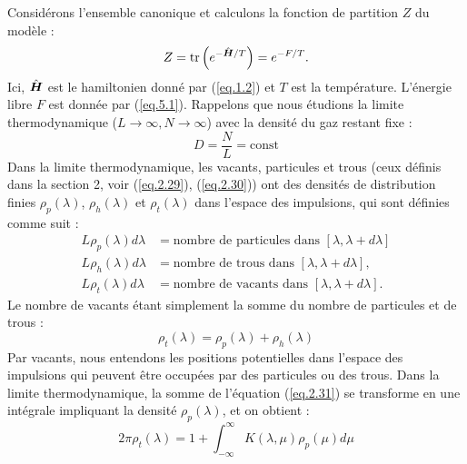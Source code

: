 Considérons l'ensemble canonique et calculons la fonction de partition $Z$ du modèle :
\begin{equation}
    Z = \mathrm{tr}\left(e^{- \hat{\bm{H}}/T}\right) = e^{- F/T}. \label{eq.5.1}
\end{equation}
Ici, $\hat{\bm{H}}$ est le hamiltonien donné par (\ref{eq.1.2}) et $T$ est la température. L'énergie libre $F$ est donnée par (\ref{eq.5.1}). Rappelons que nous étudions la limite thermodynamique ($L \rightarrow \infty, N \rightarrow \infty$) avec la densité du gaz restant fixe :
\begin{equation}
    D = \frac{N}{L} = \text{const}
\end{equation}
Dans la limite thermodynamique, les vacants, particules et trous (ceux définis dans la section 2, voir (\ref{eq.2.29}), (\ref{eq.2.30})) ont des densités de distribution finies $\rho_p(\lambda)$, $\rho_h(\lambda)$ et $\rho_t(\lambda)$ dans l'espace des impulsions, qui sont définies comme suit :
\begin{align}
    L \rho_p(\lambda) d\lambda & = \text{nombre de particules dans } [\lambda, \lambda + d\lambda] \\
    L \rho_h(\lambda) d\lambda & = \text{nombre de trous dans } [\lambda, \lambda + d\lambda] ,\\
    L \rho_t(\lambda) d\lambda & = \text{nombre de vacants dans } [\lambda, \lambda + d\lambda].
\end{align}
Le nombre de vacants étant simplement la somme du nombre de particules et de trous :
\begin{equation}
    \rho_t(\lambda) = \rho_p(\lambda) + \rho_h(\lambda)
\end{equation}
Par vacants, nous entendons les positions potentielles dans l'espace des impulsions qui peuvent être occupées par des particules ou des trous. Dans la limite thermodynamique, la somme de l'équation (\ref{eq.2.31}) se transforme en une intégrale impliquant la densité $\rho_p(\lambda)$, et on obtient :
\begin{equation}
    2\pi \rho_t(\lambda) = 1 + \int_{-\infty}^{\infty} K(\lambda, \mu) \rho_p(\mu) d\mu
\end{equation}

